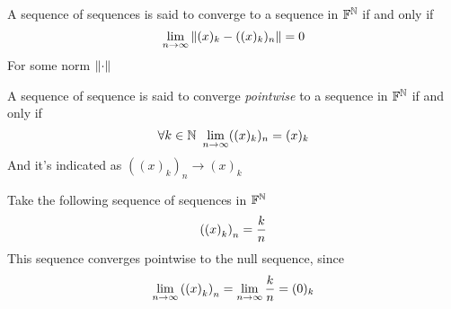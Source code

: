 \documentclass[../complete.tex]{subfiles}
\begin{document}
\begin{dfn}
	A sequence of sequences is said to converge to a sequence in $\mathbb{F}^{\mathbb{N}}$ if and only if
	\begin{equation}
		\lim_{n\to\infty}\norm{(x)_k-((x)_k)_n}=0
		\label{eq:seqseqconv}
	\end{equation}
	For some norm $\norm{\cdot}$
\end{dfn}
\begin{dfn}
	A sequence of sequence is said to converge \textit{pointwise} to a sequence in $\mathbb{F}^{\mathbb{N}}$ if and only if
	\begin{equation}
		\forall k\in\N\ \lim_{n\to\infty}((x)_k)_n=(x)_k
		\label{eq:pointwiseconvseqseq}
	\end{equation}
	And it's indicated as $((x)_k)_n\to(x)_k$
\end{dfn}
\begin{eg}
	Take the following sequence of sequences in $\mathbb{F}^{\mathbb{N}}$
	\begin{equation*}
		\left(\left(x\right)_{k}\right)_{n}=\frac{k}{n}
	\end{equation*}
	This sequence converges pointwise to the null sequence, since
	\begin{equation*}
		\lim_{n\to\infty}\left(\left(x\right)_{k}\right)_{n}=\lim_{n\to\infty}\frac{k}{n}=(0)_k
	\end{equation*}
\end{eg}
\end{document}
